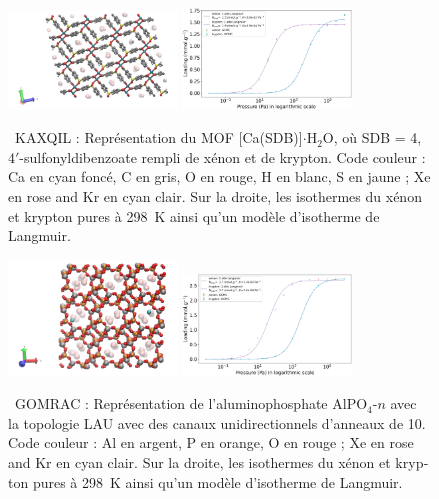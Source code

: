 \documentclass[thesis]{subfiles}
\begin{document}
\begin{otherlanguage}{french}
\begin{figure}[h]
\centering
  \includegraphics[width=0.4\textwidth]{figures/2-thermo/KAXQIL_clean.jpg}
  \includegraphics[width=0.4\textwidth]{figures/2-thermo/KAXQIL_clean_isotherm_xenon_krypton_298K.jpg}
  \caption{\small{\ KAXQIL : Représentation du MOF [Ca(SDB)]$\cdot$H$_2$O, où SDB = 4,$4'$-sulfonyldibenzoate rempli de xénon et de krypton. Code couleur : Ca en cyan foncé, C en gris, O en rouge, H en blanc, S en jaune ; Xe en rose and Kr en cyan clair. Sur la droite, les isothermes du xénon et krypton pures à \SI{298}{\kelvin} ainsi qu'un modèle d'isotherme de Langmuir.}}
  \label{KAXQIL_resume}
\end{figure}

\begin{figure}[h]
\centering
  \includegraphics[width=0.4\textwidth]{figures/2-thermo/GOMRAC_clean.jpg}
  \includegraphics[width=0.4\textwidth]{figures/2-thermo/GOMRAC_clean_isotherm_xenon_krypton_298K.jpg}
  \caption{\small{\ GOMRAC : Représentation de l'aluminophosphate AlPO$_4$-$n$ avec la topologie LAU avec des canaux unidirectionnels d'anneaux de 10. Code couleur : Al en argent, P en orange, O en rouge ; Xe en rose and Kr en cyan clair. Sur la droite, les isothermes du xénon et krypton pures à \SI{298}{\kelvin} ainsi qu'un modèle d'isotherme de Langmuir.}}
  \label{GOMRAC_resume}
\end{figure}


\end{otherlanguage}
\end{document}
